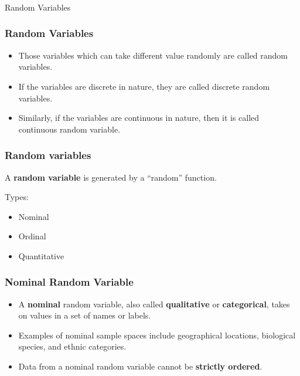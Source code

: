 \begin{frame}[fragile]\frametitle{}
\begin{center}
{\Large Random Variables}
\end{center}
\end{frame}

\begin{frame}\frametitle{Random Variables}
\begin{itemize}
\item Those variables which can take different value randomly are called
random variables.
\item If the variables are discrete in nature, they are called discrete random
variables.
\item Similarly, if the variables are continuous in nature, then it is called
continuous random variable.
\end{itemize}
\end{frame}



\begin{frame} \frametitle{Random variables}
A {\bf random variable} is generated by a ``random'' function. 

Types:
\begin{itemize}
\item Nominal
\item Ordinal
\item Quantitative
\end{itemize}
\end{frame}


\begin{frame}\frametitle{Nominal Random Variable}
\begin{itemize}
\item A {\bf nominal} random variable, also called {\bf qualitative} or {\bf  categorical}, takes on values in a set of names or labels.
\item Examples of nominal sample spaces include geographical locations, biological species, and ethnic categories.
\item Data from a nominal random variable cannot be {\bf strictly ordered}.
\end{itemize}
\end{frame}

